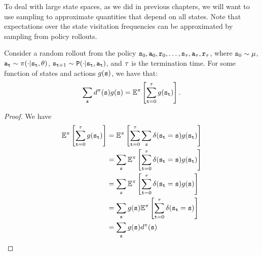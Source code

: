 To deal with large state spaces, as we did in previous chapters, we will want to use sampling to approximate quantities that depend on all states. Note that expectations over the state visitation frequencies can be approximated by sampling from policy rollouts.
\begin{proposition}\label{prop:rollout_sampling}
    Consider a random rollout from the policy ${\tt s}_0,{\tt a}_0,{\tt r}_0,\dots,{\tt s}_\tau, {\tt a}_\tau, {\tt r}_\tau$, where ${\tt s}_0 \sim \mu$, ${\tt a}_{\tt t}\sim \pi(\cdot|{\tt s}_{\tt t},\theta)$, ${\tt s}_{{\tt t}+1} \sim {\tt P} (\cdot | {\tt s}_{\tt t}, {\tt a}_{\tt t})$, and $\tau$ is the termination time. For some function of states and actions $g({\tt s})$, we have that:
    \begin{equation*}
        \sum_{{\tt s}} d^{\pi}({\tt s}) g({\tt s}) = \mathbb{E}^{\pi}\left[ \sum_{{\tt t}=0}^\tau g({\tt s}_{\tt t})\right].
    \end{equation*}
\end{proposition}
\begin{proof}
    We have
    \begin{equation*}
        \begin{split}
            \mathbb{E}^{\pi}\left[ \sum_{{\tt t}=0}^\tau g({\tt s}_{\tt t})\right] &= \mathbb{E}^{\pi}\left[ \sum_{{\tt t}=0}^\tau \sum_{{\tt s}} \delta({\tt s}_{\tt t} = {\tt s})g({\tt s}_{\tt t})\right] \\
            &= \sum_{{\tt s}}\mathbb{E}^{\pi}\left[\sum_{{\tt t}=0}^\tau \delta({\tt s}_{\tt t} = {\tt s})g({\tt s}_{\tt t})\right] \\
            &= \sum_{{\tt s}}\mathbb{E}^{\pi}\left[\sum_{{\tt t}=0}^\tau \delta({\tt s}_{\tt t} = {\tt s})g({\tt s})\right] \\
            &= \sum_{{\tt s}}g({\tt s})\mathbb{E}^{\pi}\left[\sum_{{\tt t}=0}^\tau \delta({\tt s}_{\tt t} = {\tt s})\right] \\
            &= \sum_{{\tt s}}g({\tt s})d^{\pi}({\tt s}) \\
        \end{split}
    \end{equation*}
\end{proof}

